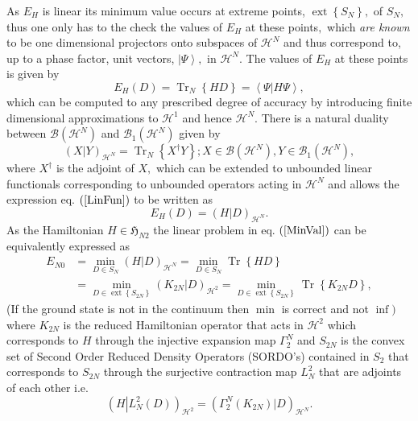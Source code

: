 \documentclass[aps,preprint]{revtex4}%
\begin{document}
As $E_{H}$ is linear its minimum value occurs at extreme points,
$\operatorname*{ext}\left\{  S_{N}\right\}  ,$ of $S_{N},$ thus one only has
to the check the values of $E_{H}$ at these points$,$ which \emph{are known}
to be one dimensional projectors onto subspaces of $\mathcal{H}^{N}$ and thus
correspond to, up to a phase factor, unit vectors, $\left\vert \Psi
\right\rangle ,$ in $\mathcal{H}^{N}.$ The values of $E_{H}$ at these points
is given by
\begin{equation}
E_{H}\left(  D\right)  =\operatorname*{Tr}\nolimits_{N}\left\{  HD\right\}
=\left\langle \left.  \Psi\right\vert H\Psi\right\rangle , \label{Enval}%
\end{equation}
which can be computed to any prescribed degree of accuracy by introducing
finite dimensional approximations to $\mathcal{H}^{1}$ and hence
$\mathcal{H}^{N}$. There is a natural duality between $\mathcal{B}\left(
\mathcal{H}^{N}\right)  $ and $\mathcal{B}_{1}\left(  \mathcal{H}^{N}\right)
$ given by
\begin{equation}
\left(  X\left\vert Y\right.  \right)  _{\mathcal{H}^{N}}=\operatorname*{Tr}%
\nolimits_{N}\left\{  X^{\dagger}Y\right\}  ;X\in\mathcal{B}\left(
\mathcal{H}^{N}\right)  ,Y\in\mathcal{B}_{1}\left(  \mathcal{H}^{N}\right)  ,
\end{equation}
where $X^{\dagger}$ is the adjoint of $X,$ which can be extended to unbounded
linear functionals corresponding to unbounded operators acting in
$\mathcal{H}^{N}$ and allows the expression eq. $\left(  \ref{LinFun}\right)
$ to be written as
\begin{equation}
E_{H}\left(  D\right)  =\left(  H\left\vert D\right.  \right)  _{\mathcal{H}%
^{N}}.
\end{equation}
As the Hamiltonian $H\in\mathfrak{H}_{N2}$ the linear problem in eq. $\left(
\ref{MinVal}\right)  $ can be equivalently expressed as
\begin{align}
E_{N0}  &  =\min_{D\in S_{N}}\left(  H\left\vert D\right.  \right)
_{\mathcal{H}^{N}}=\min_{D\in S_{N}}\operatorname*{Tr}\left\{  HD\right\}
\label{MinVal2}\\
&  =\min_{D\in\operatorname*{ext}\left\{  S_{2N}\right\}  }\left(
K_{2N}\left\vert D\right.  \right)  _{\mathcal{H}^{2}}=\min_{D\in
\operatorname*{ext}\left\{  S_{2N}\right\}  }\operatorname*{Tr}\left\{
K_{2N}D\right\}  ,
\end{align}
(If the ground state is not in the continuum then $\min$ is correct and not
$\inf)$ where $K_{2N}$ is the reduced Hamiltonian operator that acts in
$\mathcal{H}^{2}$ which corresponds to $H$ through the injective expansion map
$\Gamma_{2}^{N}$ and $S_{2N}$ is the convex set of Second Order Reduced
Density Operators (SORDO's) contained in $S_{2}$ that corresponds to $S_{2N}$
through the surjective contraction map $L_{N}^{2}$ that are adjoints of each
other i.e.
\begin{equation}
\left(  H\left\vert L_{N}^{2}\left(  D\right)  \right.  \right)
_{\mathcal{H}^{2}}=\left(  \Gamma_{2}^{N}\left(  K_{2N}\right)  \left\vert
D\right.  \right)  _{\mathcal{H}^{N}}.
\end{equation}
\end{document}
